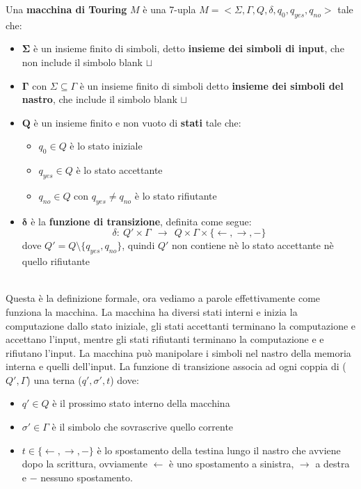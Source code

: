 \colorbox{SALZO}{\parbox{\dimexpr\linewidth-2\fboxsep}{\begin{definition}
   Una \textbf{macchina di Touring} $M$ è una 7-upla $M = <\Sigma, \Gamma,Q,\delta,q_0,q_{yes},q_{no}>$ tale che:
   \begin{itemize}
    \item $\bm{\Sigma}$ è un insieme finito di simboli, detto \textbf{insieme dei simboli di input}, che non include il simbolo blank $\sqcup$
    \item $\bm{\Gamma}$ con $\Sigma \subseteq \Gamma$ è un insieme finito di simboli detto \textbf{insieme dei simboli del nastro},
    che include il simbolo blank $\sqcup$
    \item $\bm{Q}$ è un insieme finito e non vuoto di \textbf{stati} tale che:
    \begin{itemize}
        \item $q_0 \in Q$ è lo stato iniziale
        \item $q_{yes} \in Q$ è lo stato accettante
        \item $q_{no} \in Q$ con $q_{yes} \neq q_{no}$ è lo stato rifiutante
    \end{itemize}
    \item $\bm{\delta}$ è la \textbf{funzione di transizione}, definita come segue:
    \[  \delta :\  Q' \times \Gamma\ \  \to \ \ Q \times \Gamma \times \{ \leftarrow, \rightarrow, -  \}    \]
    dove $Q' = Q\setminus \{ q_{yes}, q_{no}  \}$, quindi $Q'$ non contiene nè lo stato accettante nè quello rifiutante
   \end{itemize}
\end{definition}}}\smallskip\\
Questa è la definizione formale, ora vediamo a parole effettivamente come funziona la macchina.
La macchina ha diversi stati interni e inizia la computazione dallo stato iniziale, gli stati accettanti
terminano la computazione e accettano l'input, mentre gli stati rifiutanti terminano la computazione e 
e rifiutano l'input. La macchina può manipolare i simboli nel nastro della memoria interna e quelli dell'input.
La funzione di transizione associa ad ogni coppia di ($Q', \Gamma$) una terna ($q',\sigma',t$) dove:
\begin{itemize}
    \item $q'\in Q$ è il prossimo stato interno della macchina
    \item $\sigma' \in \Gamma$ è il simbolo che sovrascrive quello corrente
    \item $t \in \{ \leftarrow,\rightarrow, -  \}$ è lo spostamento della testina lungo il nastro che avviene dopo la scrittura,
    ovviamente $\leftarrow$ è uno spostamento a sinistra, $\rightarrow$ a destra e $-$ nessuno spostamento.
\end{itemize}








